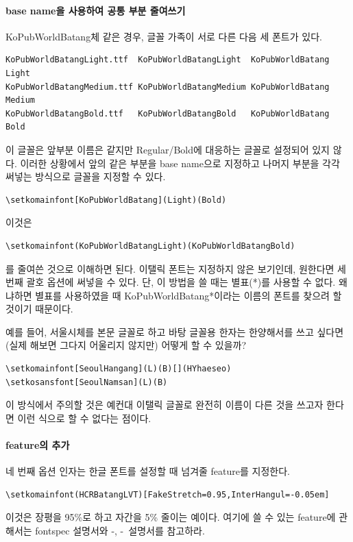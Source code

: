 \documentclass[
	12pt,
	a4paper,
	kosection,
	footnote,
	nobookmarks,
	microtype,
	figtabcapt,
]{oblivoir}
\def\xetexko{\XeTeX-\ko}
\def\luatexko{\LuaTeX-\ko}
\begin{document}
\paragraph{base name을 사용하여 공통 부분 줄여쓰기}
KoPubWorldBatang체 같은 경우, 글꼴 가족이 서로 다른 다음 세 폰트가 있다.
\begin{verbatim}
KoPubWorldBatangLight.ttf  KoPubWorldBatangLight  KoPubWorldBatang Light
KoPubWorldBatangMedium.ttf KoPubWorldBatangMedium KoPubWorldBatang Medium
KoPubWorldBatangBold.ttf   KoPubWorldBatangBold   KoPubWorldBatang Bold
\end{verbatim}
이 글꼴은 앞부분 이름은 같지만 Regular/Bold에 대응하는 글꼴로 설정되어 있지 않다.
이러한 상황에서 앞의 같은 부분을 base name으로 지정하고 나머지 부분을 각각 써넣는 방식으로 
글꼴을 지정할 수 있다.
\begin{verbatim}
\setkomainfont[KoPubWorldBatang](Light)(Bold)
\end{verbatim}
이것은
\begin{verbatim}
\setkomainfont(KoPubWorldBatangLight)(KoPubWorldBatangBold)
\end{verbatim}
를 줄여쓴 것으로 이해하면 된다. 이탤릭 폰트는 지정하지 않은 보기인데, 원한다면 세번째 괄호 옵션에
써넣을 수 있다. 단, 이 방법을 쓸 때는 별표(*)를 사용할 수 없다. 왜냐하면 별표를 사용하였을 때
KoPubWorldBatang*이라는 이름의 폰트를 찾으려 할 것이기 때문이다.

예를 들어, 서울시체를 본문 글꼴로 하고 바탕 글꼴용 한자는 한양해서를 쓰고 싶다면(실제 해보면 그다지 어울리지 않지만) 어떻게 할 수 있을까?
\begin{verbatim}
\setkomainfont[SeoulHangang](L)(B)[](HYhaeseo)
\setkosansfont[SeoulNamsan](L)(B)
\end{verbatim}

이 방식에서 주의할 것은 예컨대 이탤릭 글꼴로 완전히 이름이 다른 것을 쓰고자 한다면
이런 식으로 할 수 없다는 점이다.

\paragraph{feature의 추가}
네 번째 옵션 인자는 한글 폰트를 설정할 때 넘겨줄 feature를 지정한다.
\begin{verbatim}
\setkomainfont(HCRBatangLVT)[FakeStretch=0.95,InterHangul=-0.05em]
\end{verbatim}
이것은 장평을 95\%로 하고 자간을 5\% 줄이는 예이다. 여기에 쓸 수 있는 feature에 관해서는
fontspec 설명서와 \xetexko, \luatexko\ 설명서를 참고하라.
\end{document}
